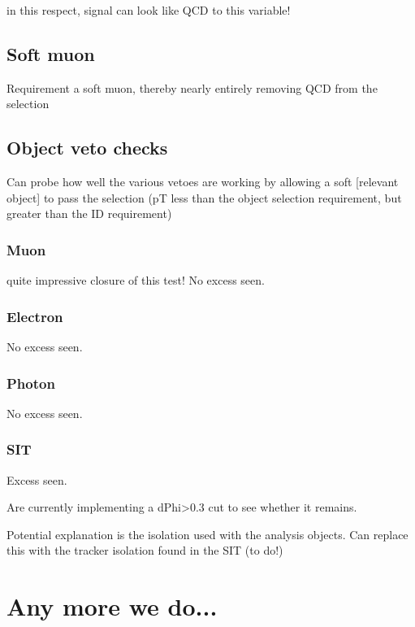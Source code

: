 in this respect, signal can look like QCD to this variable!

\subsection{Soft muon}
Requirement a soft muon, thereby nearly entirely removing QCD from the 
selection

\subsection{Object veto checks}
Can probe how well the various vetoes are working by allowing a soft [relevant 
object] to pass the selection (pT less than the object selection requirement, 
but greater than the ID requirement)

\subsubsection{Muon}
quite impressive closure of this test! No excess seen.

\subsubsection{Electron}
No excess seen.

\subsubsection{Photon}
No excess seen.

\subsubsection{SIT}
Excess seen.

Are currently implementing a dPhi>0.3 cut to see whether it remains.

Potential explanation is the isolation used with the analysis objects. Can 
replace this with the tracker isolation found in the SIT (to do!) 

\section{Any more we do...}
